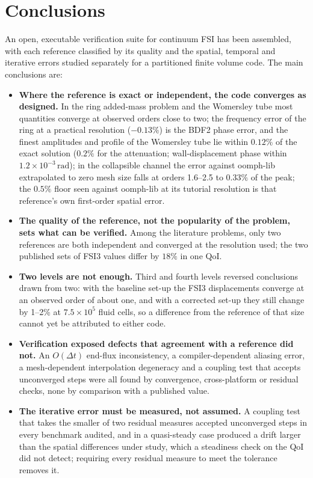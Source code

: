 \documentclass[sn-mathphys,Numbered]{sn-jnl}%
\begin{document}
\section{Conclusions} \label{sec:conclusion}
An open, executable verification suite for continuum FSI has been assembled, with each reference classified by its quality and the spatial, temporal and iterative errors studied separately for a partitioned finite volume code.
The main conclusions are:
\begin{itemize}
	\item \textbf{Where the reference is exact or independent, the code converges as designed.} In the ring added-mass problem and the Womersley tube most quantities converge at observed orders close to two; the frequency error of the ring at a practical resolution ($-0.13\%$) is the BDF2 phase error, and the finest amplitudes and profile of the Womersley tube lie within $0.12\%$ of the exact solution ($0.2\%$ for the attenuation; wall-displacement phase within $1.2\times10^{-3}\,\mathrm{rad}$); in the collapsible channel the error against oomph-lib extrapolated to zero mesh size falls at orders 1.6--2.5 to $0.33\%$ of the peak; the $0.5\%$ floor seen against oomph-lib at its tutorial resolution is that reference's own first-order spatial error.
	\item \textbf{The quality of the reference, not the popularity of the problem, sets what can be verified.} Among the literature problems, only two references are both independent and converged at the resolution used; the two published sets of FSI3 values differ by $18\%$ in one QoI.
	\item \textbf{Two levels are not enough.} Third and fourth levels reversed conclusions drawn from two: with the baseline set-up the FSI3 displacements converge at an observed order of about one, and with a corrected set-up they still change by 1--2\% at $7.5\times10^5$ fluid cells, so a difference from the reference of that size cannot yet be attributed to either code.
	\item \textbf{Verification exposed defects that agreement with a reference did not.} An $O(\Delta t)$ end-flux inconsistency, a compiler-dependent aliasing error, a mesh-dependent interpolation degeneracy and a coupling test that accepts unconverged steps were all found by convergence, cross-platform or residual checks, none by comparison with a published value.
	\item \textbf{The iterative error must be measured, not assumed.} A coupling test that takes the smaller of two residual measures accepted unconverged steps in every benchmark audited, and in a quasi-steady case produced a drift larger than the spatial differences under study, which a steadiness check on the QoI did not detect; requiring every residual measure to meet the tolerance removes it.
\end{itemize}
\end{document}
